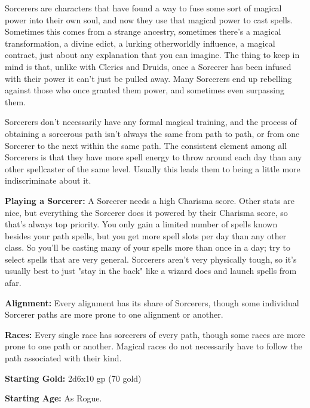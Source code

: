 
Sorcerers are characters that have found a way to fuse some sort of magical power into their own soul, and now they use that magical power to cast spells. Sometimes this comes from a strange ancestry, sometimes there's a magical transformation, a divine edict, a lurking otherworldly influence, a magical contract, just about any explanation that you can imagine. The thing to keep in mind is that, unlike with Clerics and Druids, once a Sorcerer has been infused with their power it can't just be pulled away. Many Sorcerers end up rebelling against those who once granted them power, and sometimes even surpassing them.

Sorcerers don't necessarily have any formal magical training, and the process of obtaining a sorcerous path isn't always the same from path to path, or from one Sorcerer to the next within the same path. The consistent element among all Sorcerers is that they have more spell energy to throw around each day than any other spellcaster of the same level. Usually this leads them to being a little more indiscriminate about it.

\textbf{Playing a Sorcerer:} A Sorcerer needs a high Charisma score. Other stats are nice, but everything the Sorcerer does it powered by their Charisma score, so that's always top priority. You only gain a limited number of spells known besides your path spells, but you get more spell slots per day than any other class. So you'll be casting many of your spells more than once in a day; try to select spells that are very general. Sorcerers aren't very physically tough, so it's usually best to just "stay in the back" like a wizard does and launch spells from afar.

\textbf{Alignment:} Every alignment has its share of Sorcerers, though some individual Sorcerer paths are more prone to one alignment or another.

\textbf{Races:} Every single race has sorcerers of every path, though some races are more prone to one path or another. Magical races do not necessarily have to follow the path associated with their kind.

\textbf{Starting Gold:} 2d6x10 gp (70 gold)

\textbf{Starting Age:} As Rogue.

